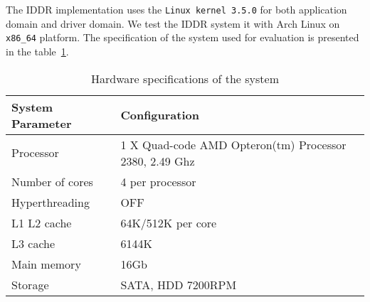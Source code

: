 The IDDR implementation uses the \texttt{Linux kernel 3.5.0} for both application domain and driver domain. We test the IDDR system it with Arch Linux on \texttt{x86\_64} platform. The specification of the system used for evaluation is presented in the table~\ref{tab:config}. 

\begin{table}
\caption{Hardware specifications of the system}
\begin{center}
\begin{tabular}{ll}
  \hline
  \label{tab:config}
  System Parameter & Configuration \\
  \hline
  Processor & 1 X Quad-code AMD Opteron(tm) Processor 2380, 2.49 Ghz \\
  Number of cores & 4 per processor \\
  Hyperthreading & OFF \\
  L1 L2 cache & 64K/512K per core \\
  L3 cache & 6144K \\
  Main memory & 16Gb \\
  Storage & SATA, HDD 7200RPM \\
  \hline 
\end{tabular}
\end{center}
\end{table}

